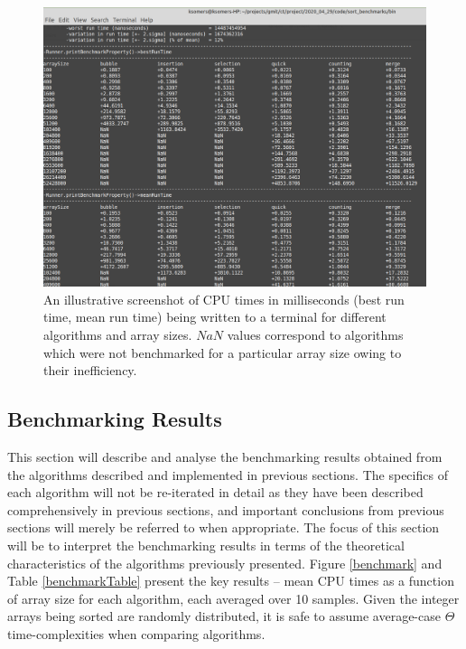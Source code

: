 \documentclass[12pt,a4paper]{article}
\begin{document}
\begin{figure}
\includegraphics[scale=0.25]{screenshot.png} 
\caption{An illustrative screenshot of CPU times in milliseconds (best run time, mean run time) being written to a terminal for different algorithms and array sizes. $NaN$ values correspond to algorithms which were not benchmarked for a particular array size owing to their inefficiency.}
\label{terminalOutput2}
\end{figure}



\subsection{Benchmarking Results}
This section will describe and analyse the benchmarking results obtained from the algorithms described and implemented in previous sections. The specifics of each algorithm will not be re-iterated in detail as they have been described comprehensively in previous sections, and important conclusions from previous sections will merely be referred to when appropriate. The focus of this section will be to interpret the benchmarking results in terms of the theoretical characteristics of the  algorithms previously presented. Figure \ref{benchmark} and Table \ref{benchmarkTable} present the key results -- mean CPU times as a function of array size for each algorithm, each averaged over 10 samples.  Given the integer arrays being sorted are randomly distributed, it is safe to assume average-case $\Theta$ time-complexities when comparing algorithms.
\end{document}
